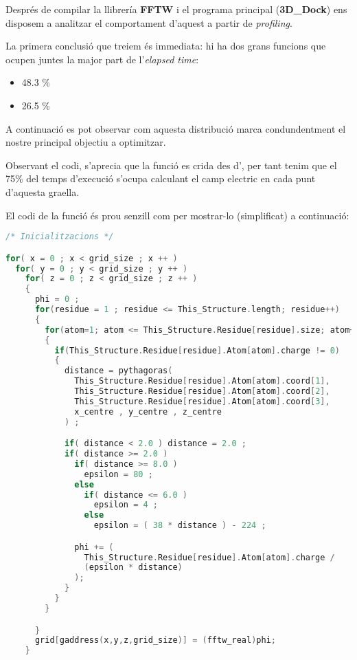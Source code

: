 
Després de compilar la llibrería \textbf{FFTW} i el programa principal (\textbf{3D\_Dock}) ens disposem a analitzar el comportament d'aquest a partir de \emph{profiling}.

La primera conclusió que treiem és immediata: hi ha dos grans funcions que ocupen juntes la major part de l'\emph{elapsed time}:

\begin{itemize}
  \item {} 48.3 \%
  \item {} 26.5 \%
\end{itemize}

A continuació es pot observar com aquesta distribució marca condundentment el nostre principal objectiu a optimitzar.


Observant el codi, s'aprecia que la funció  es crida des d', per tant tenim que el 75\% del temps d'execució s'ocupa calculant el camp electric en cada punt d'aquesta graella.

El codi de la funció  és prou senzill com per mostrar-lo (simplificat) a continuació:

\begin{lstlisting}[label=ef0, caption=Codi original d'electric\_field, language=C]
/* Inicialitzacions */

for( x = 0 ; x < grid_size ; x ++ )
  for( y = 0 ; y < grid_size ; y ++ )
    for( z = 0 ; z < grid_size ; z ++ )
    {
      phi = 0 ;
      for(residue = 1 ; residue <= This_Structure.length; residue++)
      {
        for(atom=1; atom <= This_Structure.Residue[residue].size; atom++)
        {
          if(This_Structure.Residue[residue].Atom[atom].charge != 0)
          {
            distance = pythagoras(
              This_Structure.Residue[residue].Atom[atom].coord[1],
              This_Structure.Residue[residue].Atom[atom].coord[2],
              This_Structure.Residue[residue].Atom[atom].coord[3],
              x_centre , y_centre , z_centre
            ) ;

            if( distance < 2.0 ) distance = 2.0 ;
            if( distance >= 2.0 )
              if( distance >= 8.0 )
                epsilon = 80 ;
              else
                if( distance <= 6.0 )
                  epsilon = 4 ;
                else
                  epsilon = ( 38 * distance ) - 224 ;

              phi += (
                This_Structure.Residue[residue].Atom[atom].charge /
                (epsilon * distance)
              );
            }
          }
        }

      }
      grid[gaddress(x,y,z,grid_size)] = (fftw_real)phi;
    }
\end{lstlisting}


